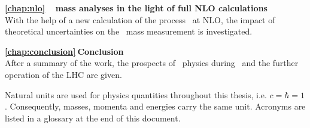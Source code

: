\begin{description}
\item{\bf{\ref{chap:nlo}$~~~$\Tquark\ mass analyses in the light of full \gls{NLO} calculations}}
\\ With the help of a new calculation of the process \ppWWbb\ at \gls{NLO}, the impact of theoretical uncertainties on the \tquark\ mass measurement is investigated.

\item{\bf{\ref{chap:conclusion}$~$Conclusion}}
\\ After a summary of the work, the prospects of \tquark\ physics during \RunTwo\ and the further operation of the \gls{LHC} are given.
\end{description}

Natural units are used for physics quantities throughout this thesis, i.e. $c=\hbar=1$. Consequently, masses, momenta and energies carry the same unit. Acronyms are listed in a glossary at the end of this document.
